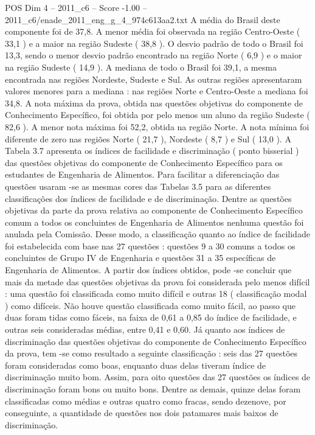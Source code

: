 \begin{textsample}{POS Dim 4 – 2011\_c6 – Score -1.00 – 2011\_c6/enade\_2011\_eng\_g\_4\_974c613aa2.txt}
A média do Brasil deste componente foi de 37,8.
A menor média foi observada na região Centro-Oeste ( 33,1 ) e a maior na região Sudeste ( 38,8 ).
O desvio padrão de todo o Brasil foi 13,3, sendo o menor desvio padrão encontrado na região Norte ( 6,9 ) e o maior na região Sudeste ( 14,9 ).
A mediana de todo o Brasil foi 39,1, a mesma encontrada nas regiões Nordeste, Sudeste e Sul.
As outras regiões apresentaram valores menores para a mediana : nas regiões Norte e Centro-Oeste a mediana foi 34,8.
A nota máxima da prova, obtida nas questões objetivas do componente de Conhecimento Específico, foi obtida por pelo menos um aluno da região Sudeste ( 82,6 ).
A menor nota máxima foi 52,2, obtida na região Norte.
A nota mínima foi diferente de zero nas regiões Norte ( 21,7 ), Nordeste ( 8,7 ) e Sul ( 13,0 ).
A Tabela 3.7 apresenta os índices de facilidade e discriminação ( ponto bisserial ) das questões objetivas do componente de Conhecimento Específico para os estudantes de Engenharia de Alimentos.
Para facilitar a diferenciação das questões usaram -se as mesmas cores das Tabelas 3.5 para as diferentes classificações dos índices de facilidade e de discriminação.
Dentre as questões objetivas da parte da prova relativa ao componente de Conhecimento Específico comum a todos os concluintes de Engenharia de Alimentos nenhuma questão foi anulada pela Comissão.
Desse modo, a classificação quanto ao índice de facilidade foi estabelecida com base nas 27 questões : questões 9 a 30 comuns a todos os concluintes de Grupo IV de Engenharia e questões 31 a 35 específicas de Engenharia de Alimentos.
A partir dos índices obtidos, pode -se concluir que mais da metade das questões objetivas da prova foi considerada pelo menos difícil : uma questão foi classificada como muito difícil e outras 18 ( classificação modal ) como difíceis.
Não houve questão classificada como muito fácil, ao passo que duas foram tidas como fáceis, na faixa de 0,61 a 0,85 do índice de facilidade, e outras seis consideradas médias, entre 0,41 e 0,60.
Já quanto aos índices de discriminação das questões objetivas do componente de Conhecimento Específico da prova, tem -se como resultado a seguinte classificação : seis das 27 questões foram consideradas como boas, enquanto duas delas tiveram índice de discriminação muito bom.
Assim, para oito questões das 27 questões os índices de discriminação foram bons ou muito bons.
Dentre as demais, quinze delas foram classificadas como médias e outras quatro como fracas, sendo dezenove, por conseguinte, a quantidade de questões nos dois patamares mais baixos de discriminação.

\end{textsample}
